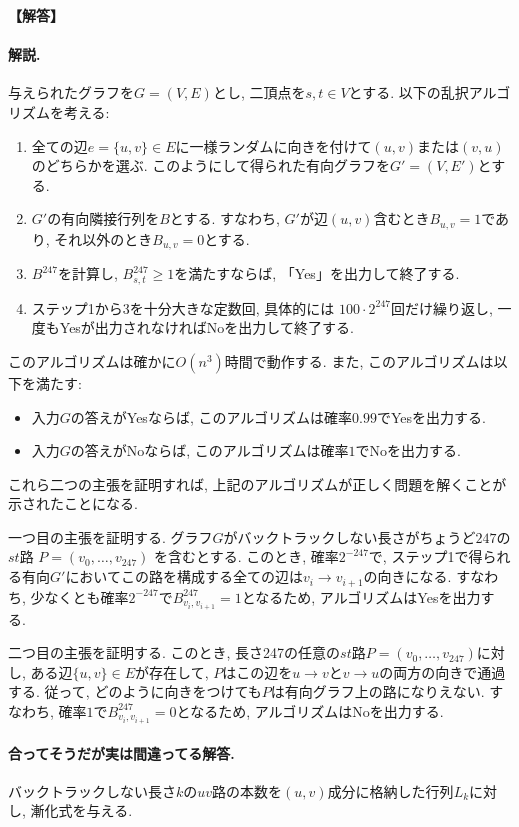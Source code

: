 \documentclass[12pt,a4paper]{article}
\newenvironment{solution}{
    \vspace{0.5em}
    \begin{tcolorbox}[colback=white, colframe=black, boxrule=1pt, arc=0mm, breakable]
    \noindent
    \textbf{【解答】}
    \vspace{0.3em}
}{
    \end{tcolorbox}
    \vspace{1em}
}
\begin{document}
\begin{solution}
  \paragraph*{解説.}
  与えられたグラフを$G=(V,E)$とし, 二頂点を$s,t\in V$とする.
  以下の乱択アルゴリズムを考える:
  \begin{enumerate}
    \item 全ての辺$e=\{u,v\}\in E$に一様ランダムに向きを付けて$(u,v)$または$(v,u)$のどちらかを選ぶ. このようにして得られた有向グラフを$G'=(V,E')$とする.
    \item $G'$の有向隣接行列を$B$とする. すなわち, $G'$が辺$(u,v)$含むとき$B_{u,v}=1$であり, それ以外のとき$B_{u,v}=0$とする.
    \item $B^{247}$を計算し, $B^{247}_{s,t}\ge 1$を満たすならば, 「Yes」を出力して終了する.
    \item ステップ1から3を十分大きな定数回, 具体的には $100\cdot 2^{247}$回だけ繰り返し, 一度もYesが出力されなければNoを出力して終了する.
  \end{enumerate}
  このアルゴリズムは確かに$O(n^3)$時間で動作する. また, このアルゴリズムは以下を満たす:
  \begin{itemize}
    \item 入力$G$の答えがYesならば, このアルゴリズムは確率$0.99$でYesを出力する.
    \item 入力$G$の答えがNoならば, このアルゴリズムは確率$1$でNoを出力する.
  \end{itemize}
  これら二つの主張を証明すれば, 上記のアルゴリズムが正しく問題を解くことが示されたことになる.
  
  一つ目の主張を証明する. グラフ$G$がバックトラックしない長さがちょうど$247$の$st$路 $P=(v_0,\dots,v_{247})$ を含むとする. このとき, 確率$2^{-247}$で, ステップ1で得られる有向$G'$においてこの路を構成する全ての辺は$v_i \to v_{i+1}$の向きになる. すなわち, 少なくとも確率$2^{-247}$で$B^{247}_{v_i,v_{i+1}}=1$となるため, アルゴリズムはYesを出力する.

  二つ目の主張を証明する. このとき, 長さ247の任意の$st$路$P=(v_0,\dots,v_{247})$に対し, ある辺$\{u,v\}\in E$が存在して, $P$はこの辺を$u\to v$と$v \to u$の両方の向きで通過する. 従って, どのように向きをつけても$P$は有向グラフ上の路になりえない. すなわち, 確率$1$で$B^{247}_{v_i,v_{i+1}}=0$となるため, アルゴリズムはNoを出力する.


  \paragraph*{合ってそうだが実は間違ってる解答.}
  バックトラックしない長さ$k$の$uv$路の本数を$(u,v)$成分に格納した行列$L_k$に対し, 漸化式を与える.
  

\end{solution}
\end{document}
